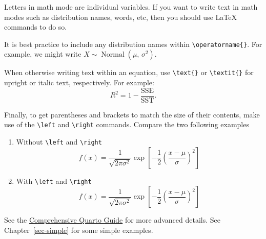 \documentclass[
  11pt,
  letterpaper,
  twoside]{report}
\begin{document}
\begin{enumerate}
  \begin{tcolorbox}[enhanced jigsaw, coltitle=black, leftrule=.75mm, titlerule=0mm, rightrule=.15mm, toprule=.15mm, opacityback=0, colbacktitle=quarto-callout-note-color!10!white, breakable, colback=white, left=2mm, opacitybacktitle=0.6, bottomtitle=1mm, bottomrule=.15mm, colframe=quarto-callout-note-color-frame, title=\textcolor{quarto-callout-note-color}{\faInfo}\hspace{0.5em}{Note}, arc=.35mm, toptitle=1mm]

  Letters in math mode are individual variables. If you want to write
  text in math modes such as distribution names, words, etc, then you
  should use LaTeX commands to do so.

  It is best practice to include any distribution names within
  \texttt{\textbackslash{}operatorname\{\}}. For example, we might write
  \(X \sim \operatorname{Normal}(\mu,\, \sigma^2)\).

  When otherwise writing text within an equation, use
  \texttt{\textbackslash{}text\{\}} or
  \texttt{\textbackslash{}textit\{\}} for upright or italic text,
  respectively. For example: \[
  R^2 = 1 - \frac{\text{SSE}}{\text{SST}}.
  \]

  Finally, to get parentheses and brackets to match the size of their
  contents, make use of the \texttt{\textbackslash{}left} and
  \texttt{\textbackslash{}right} commands. Compare the two following
  examples

  \begin{enumerate}
  \def\labelenumii{\arabic{enumii}.}
  \item
    Without \texttt{\textbackslash{}left} and
    \texttt{\textbackslash{}right} \[
    f(x) = \frac{1}{\sqrt{2 \pi \sigma^2}} 
        \exp [-\frac{1}{2} (\frac{x - \mu}{\sigma})^2] 
    \]
  \item
    With \texttt{\textbackslash{}left} and
    \texttt{\textbackslash{}right} \[
    f(x) = \frac{1}{\sqrt{2 \pi \sigma^2}} 
        \exp \left[-\frac{1}{2} \left(\frac{x - \mu}{\sigma}\right)^2 \right] 
    \]
  \end{enumerate}

  \end{tcolorbox}
\end{enumerate}

See the \href{https://quarto.org/docs/guide/}{Comprehensive Quarto
Guide} for more advanced details. See Chapter~\ref{sec-simple} for some
simple examples.

\end{document}
